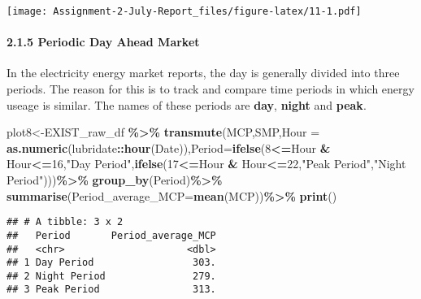 \documentclass[
]{article}
\newenvironment{Shaded}{\begin{snugshade}}{\end{snugshade}}
\newcommand{\DataTypeTok}[1]{\textcolor[rgb]{0.13,0.29,0.53}{#1}}
\newcommand{\DecValTok}[1]{\textcolor[rgb]{0.00,0.00,0.81}{#1}}
\newcommand{\KeywordTok}[1]{\textcolor[rgb]{0.13,0.29,0.53}{\textbf{#1}}}
\newcommand{\NormalTok}[1]{#1}
\newcommand{\OperatorTok}[1]{\textcolor[rgb]{0.81,0.36,0.00}{\textbf{#1}}}
\newcommand{\StringTok}[1]{\textcolor[rgb]{0.31,0.60,0.02}{#1}}
\begin{document}
\texttt{[image: Assignment-2-July-Report\_files/figure-latex/11-1.pdf]}

\hypertarget{periodic-day-ahead-market}{%
\paragraph{2.1.5 Periodic Day Ahead
Market}\label{periodic-day-ahead-market}}

In the electricity energy market reports, the day is generally divided
into three periods. The reason for this is to track and compare time
periods in which energy useage is similar. The names of these periods
are \textbf{day}, \textbf{night} and \textbf{peak}.

\begin{Shaded}
\begin{Highlighting}[]
\NormalTok{plot8\textless{}{-}EXIST\_raw\_df }\OperatorTok{\%\textgreater{}\%}\StringTok{ }
\KeywordTok{transmute}\NormalTok{(MCP,SMP,}\DataTypeTok{Hour =} \KeywordTok{as.numeric}\NormalTok{(lubridate}\OperatorTok{::}\KeywordTok{hour}\NormalTok{(Date)),}\DataTypeTok{Period=}\KeywordTok{ifelse}\NormalTok{(}\DecValTok{8}\OperatorTok{\textless{}=}\NormalTok{Hour }\OperatorTok{\&}\StringTok{ }\NormalTok{Hour}\OperatorTok{\textless{}=}\DecValTok{16}\NormalTok{,}\StringTok{"Day Period"}\NormalTok{,}\KeywordTok{ifelse}\NormalTok{(}\DecValTok{17}\OperatorTok{\textless{}=}\NormalTok{Hour }\OperatorTok{\&}\StringTok{ }\NormalTok{Hour}\OperatorTok{\textless{}=}\DecValTok{22}\NormalTok{,}\StringTok{"Peak Period"}\NormalTok{,}\StringTok{"Night Period"}\NormalTok{)))}\OperatorTok{\%\textgreater{}\%}\StringTok{  }\KeywordTok{group\_by}\NormalTok{(Period)}\OperatorTok{\%\textgreater{}\%}\StringTok{ }\KeywordTok{summarise}\NormalTok{(}\DataTypeTok{Period\_average\_MCP=}\KeywordTok{mean}\NormalTok{(MCP))}\OperatorTok{\%\textgreater{}\%}\StringTok{ }\KeywordTok{print}\NormalTok{()}
\end{Highlighting}
\end{Shaded}

\begin{verbatim}
## # A tibble: 3 x 2
##   Period       Period_average_MCP
##   <chr>                     <dbl>
## 1 Day Period                 303.
## 2 Night Period               279.
## 3 Peak Period                313.
\end{verbatim}
\end{document}
